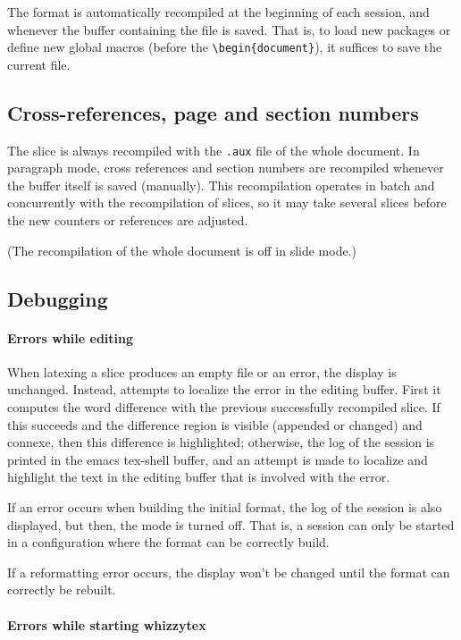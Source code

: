 \documentclass{article}
\let \lst \verb
\let \whizzy \WhizzyTeX
\begin{document}
The format is automatically recompiled at the beginning of each session, and
whenever the buffer containing the file is saved. That is, to load new
packages or define new global macros (before the \lst"\begin{document}"), it
suffices to save the current file.

\subsection {Cross-references, page and section numbers} 

The slice is always recompiled with the \lst".aux" file of the whole
document.  In paragraph mode, cross references and section numbers are 
recompiled whenever the buffer itself is saved (manually). 
This recompilation operates in batch and concurrently with the recompilation
of slices, so it may take several slices before the new counters or
references are adjusted.

(The recompilation of the whole document is off in slide mode.) 


\subsection {Debugging} 

\paragraph {Errors while editing}

When  latexing a slice produces an empty file or an error, the display is
unchanged. Instead, {\whizzy} attempts to localize the error in the editing
buffer. First it computes the word difference with the previous successfully
recompiled slice. If this succeeds and the difference region is visible
(appended or changed) and connexe, then this difference  is highlighted;
otherwise, the log of the session is printed in the emacs tex-shell buffer, 
and an attempt is made to localize and highlight the text in the editing
buffer that is involved with the error.


If an error occurs when building the initial format, the log of the session
is also displayed, but then, the mode is turned off. That is, a session can
only be started in a configuration where the format can be correctly build. 

If a reformatting error occurs, the display won't be changed until the format
can correctly be rebuilt.

\paragraph {Errors while starting whizzytex}


\end{document}
\end{document}
